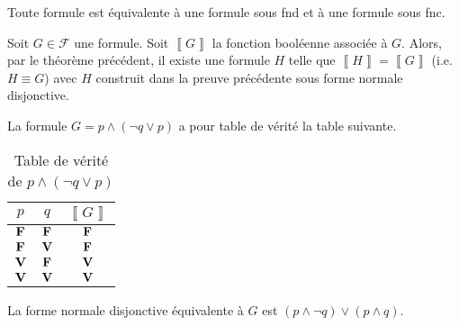 \begin{thm}
	Toute formule est équivalente à une formule sous {\sc fnd} et à une formule sous {\sc fnc}.
\end{thm}

\begin{prv}
	Soit $G \in \mathcal{F}$\/ une formule. Soit $\left\llbracket G \right\rrbracket$\/ la fonction booléenne associée à $G$. Alors, par le théorème précédent, il existe une formule $H$\/ telle que $\left\llbracket H \right\rrbracket = \left\llbracket G \right\rrbracket$\/ (i.e.\ $H \equiv G$) avec $H$\/ construit dans la preuve précédente sous forme normale disjonctive.
\end{prv}

\begin{exm}
	La formule $G = p \land (\lnot q \lor p)$\/ a pour table de vérité la table suivante.
	\begin{table}[H]
		\centering
		\begin{tabular}{c|c|c}
			$p$&$q$&$\left\llbracket G \right\rrbracket$\\ \hline
			$\mathbf{F}$&$\mathbf{F}$&$\mathbf{F}$\\
			$\mathbf{F}$&$\mathbf{V}$&$\mathbf{F}$\\
			$\mathbf{V}$&$\mathbf{F}$&$\mathbf{V}$\\
			$\mathbf{V}$&$\mathbf{V}$&$\mathbf{V}$\\
		\end{tabular}
		\caption{Table de vérité de $p \land (\lnot q \lor p)$}
	\end{table}
	La forme normale disjonctive équivalente à $G$\/ est $(p \land \lnot q) \lor (p \land q)$.
\end{exm}

